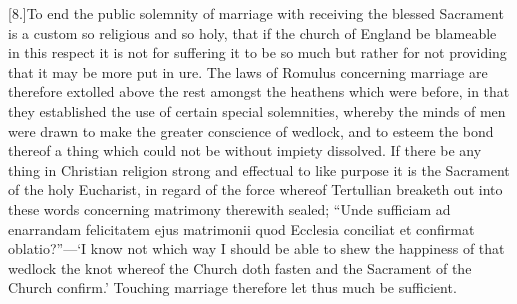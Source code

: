 [8.]To end the public solemnity of marriage with receiving the blessed Sacrament is a custom so religious and so holy, that if the church of England be blameable in this respect it is not for suffering it to be so much but rather for not providing that it may be more put in ure. The laws of Romulus concerning marriage are therefore extolled above the rest  amongst the heathens which were before,
 in that they established the use of certain special solemnities, whereby the minds of men were drawn to make the greater conscience of wedlock, and to esteem the bond thereof a thing which could not be without impiety dissolved. If there be any thing in Christian religion strong and effectual to like purpose it is the Sacrament of the holy Eucharist, in regard of the force whereof Tertullian breaketh out into these words concerning matrimony therewith sealed; “Unde sufficiam ad enarrandam felicitatem ejus matrimonii quod Ecclesia conciliat et confirmat oblatio?”—‘I know not which way I should be able to shew the happiness of that wedlock the knot whereof the Church doth fasten and the Sacrament of the Church confirm.’ Touching marriage therefore let thus much be sufficient.


